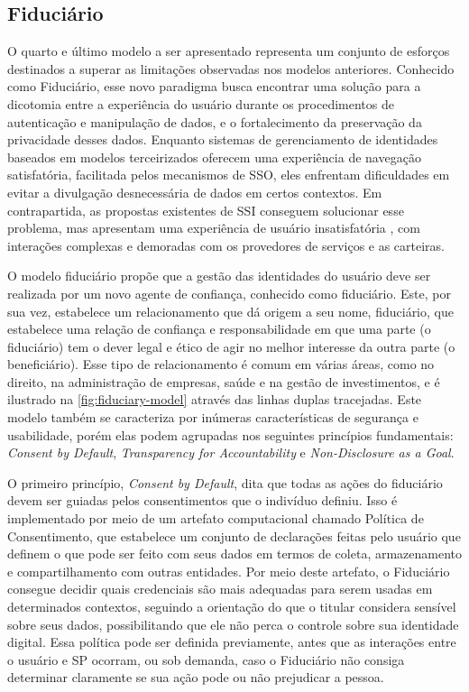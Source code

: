 \subsection{Fiduciário}\label{subsection:fiduciário}

O quarto e último modelo a ser apresentado representa um conjunto de esforços destinados a superar as limitações observadas nos modelos anteriores. Conhecido como Fiduciário, esse novo paradigma busca encontrar uma solução para a dicotomia entre a experiência do usuário durante os procedimentos de autenticação e manipulação de dados, e o fortalecimento da preservação da privacidade desses dados. Enquanto sistemas de gerenciamento de identidades baseados em modelos terceirizados oferecem uma experiência de navegação satisfatória, facilitada pelos mecanismos de \acs{SSO}, eles enfrentam dificuldades em evitar a divulgação desnecessária de dados em certos contextos. Em contrapartida, as propostas existentes de \acs{SSI} conseguem solucionar esse problema, mas apresentam uma experiência de usuário insatisfatória \cite{fiduciary}, com interações complexas e demoradas com os provedores de serviços e as carteiras.

O modelo fiduciário propõe que a gestão das identidades do usuário deve ser realizada por um novo agente de confiança, conhecido como fiduciário. Este, por sua vez, estabelece um relacionamento que dá origem a seu nome, fiduciário, que estabelece uma relação de confiança e responsabilidade em que uma parte (o fiduciário) tem o dever legal e ético de agir no melhor interesse da outra parte (o beneficiário). Esse tipo de relacionamento é comum em várias áreas, como no direito, na administração de empresas, saúde e na gestão de investimentos, e é ilustrado na \autoref{fig:fiduciary-model} através das linhas duplas tracejadas. Este modelo também se caracteriza por inúmeras características de segurança e usabilidade, porém elas podem agrupadas nos seguintes princípios fundamentais: \emph{Consent by Default}, \emph{Transparency for Accountability} e \emph{Non-Disclosure as a Goal}.




O primeiro princípio, \emph{Consent by Default}, dita que todas as ações do fiduciário devem ser guiadas pelos consentimentos que o indivíduo definiu. Isso é implementado por meio de um artefato computacional chamado Política de Consentimento, que estabelece um conjunto de declarações feitas pelo usuário que definem o que pode ser feito com seus dados em termos de coleta, armazenamento e compartilhamento com outras entidades. Por meio deste artefato, o Fiduciário consegue decidir quais credenciais são mais adequadas para serem usadas em determinados contextos, seguindo a orientação do que o titular considera sensível sobre seus dados, possibilitando que ele não perca o controle sobre sua identidade digital. Essa política pode ser definida previamente, antes que as interações entre o usuário e \acs{SP} ocorram, ou sob demanda, caso o Fiduciário não consiga determinar claramente se sua ação pode ou não prejudicar a pessoa.


